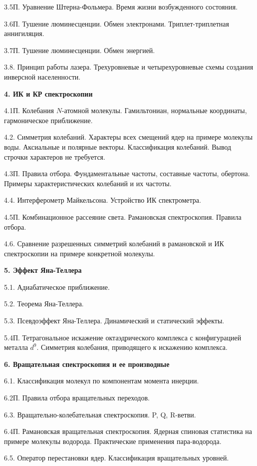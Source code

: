 3.5П. Уравнение Штерна-Фольмера. Время жизни возбужденного состояния.\par
3.6П. Тушение люминесценции. Обмен электронами. Триплет-триплетная аннигиляция.\par
3.7П. Тушение люминесценции. Обмен энергией.\par
3.8. Принцип работы лазера. Трехуровневые и четырехуровневые схемы создания инверсной населенности.\par
\textbf{4. ИК и КР спектроскопии}\par
4.1П. Колебания $N$-атомной молекулы. Гамильтониан, нормальные координаты, гармоническое приближение.\par
4.2. Симметрия колебаний. Характеры всех смещений ядер на примере молекулы воды. Аксиальные и полярные векторы. Классификация колебаний. Вывод строчки характеров не требуется.\par
4.3П. Правила отбора. Фундаментальные частоты, составные частоты, обертона. Примеры характеристических колебаний и их частоты.\par
4.4. Интерферометр Майкельсона. Устройство ИК спектрометра.\par
4.5П. Комбинационное рассеяние света. Рамановская спектроскопия. Правила отбора.\par
4.6. Сравнение разрешенных симметрий колебаний в рамановской и ИК спектроскопии на примере конкретной молекулы.\par
\textbf{5. Эффект Яна-Теллера}\par
5.1. Адиабатическое приближение.\par
5.2. Теорема Яна-Теллера.\par
5.3. Псевдоэффект Яна-Теллера. Динамический и статический эффекты.\par
5.4П. Тетрагональное искажение октаэдрического комплекса с конфигурацией металла $d^9$. Симметрия колебания, приводящего к искажению комплекса.\par
\textbf{6. Вращательная спектроскопия и ее производные}\par
6.1. Классификация молекул по компонентам момента инерции.\par
6.2П. Правила отбора вращательных переходов.\par
6.3. Вращательно-колебательная спектроскопия. P, Q, R-ветви.\par
6.4П. Рамановская вращательная спектроскопия. Ядерная спиновая статистика на примере молекулы водорода. Практические применения пара-водорода.\par
6.5. Оператор перестановки ядер. Классификация вращательных уровней.\par
